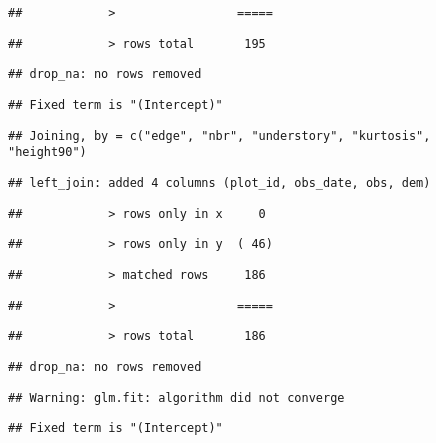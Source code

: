 \documentclass[
]{article}
\begin{document}
\begin{verbatim}
##            >                 =====
\end{verbatim}

\begin{verbatim}
##            > rows total       195
\end{verbatim}

\begin{verbatim}
## drop_na: no rows removed
\end{verbatim}

\begin{verbatim}
## Fixed term is "(Intercept)"
\end{verbatim}

\begin{verbatim}
## Joining, by = c("edge", "nbr", "understory", "kurtosis", "height90")
\end{verbatim}

\begin{verbatim}
## left_join: added 4 columns (plot_id, obs_date, obs, dem)
\end{verbatim}

\begin{verbatim}
##            > rows only in x     0
\end{verbatim}

\begin{verbatim}
##            > rows only in y  ( 46)
\end{verbatim}

\begin{verbatim}
##            > matched rows     186
\end{verbatim}

\begin{verbatim}
##            >                 =====
\end{verbatim}

\begin{verbatim}
##            > rows total       186
\end{verbatim}

\begin{verbatim}
## drop_na: no rows removed
\end{verbatim}

\begin{verbatim}
## Warning: glm.fit: algorithm did not converge
\end{verbatim}

\begin{verbatim}
## Fixed term is "(Intercept)"
\end{verbatim}
\end{document}
